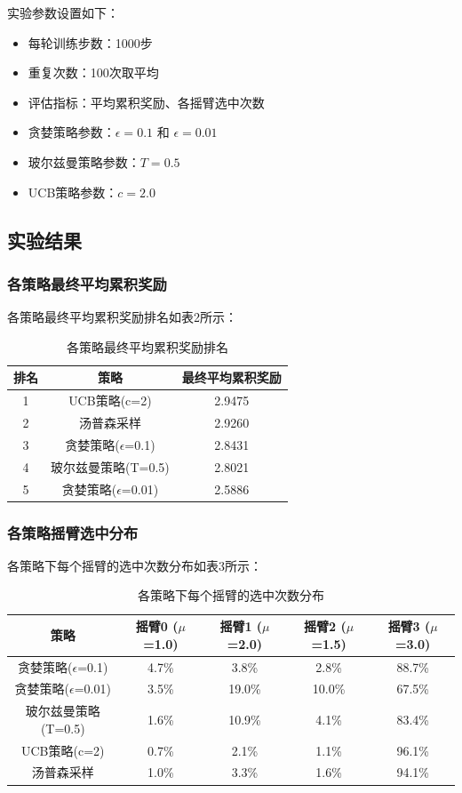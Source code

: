 \documentclass[12pt,a4paper]{article}
\begin{document}
实验参数设置如下：

\begin{itemize}
    \item 每轮训练步数：1000步
    \item 重复次数：100次取平均
    \item 评估指标：平均累积奖励、各摇臂选中次数
    \item 贪婪策略参数：$\epsilon = 0.1$ 和 $\epsilon = 0.01$
    \item 玻尔兹曼策略参数：$T = 0.5$
    \item UCB策略参数：$c = 2.0$
\end{itemize}

\subsection{实验结果}

\subsubsection{各策略最终平均累积奖励}

各策略最终平均累积奖励排名如表2所示：

\begin{table}[H]
\centering
\caption{各策略最终平均累积奖励排名}
\begin{tabular}{ccc}
\toprule
排名 & 策略 & 最终平均累积奖励 \\
\midrule
1 & UCB策略(c=2) & 2.9475 \\
2 & 汤普森采样 & 2.9260 \\
3 & 贪婪策略($\epsilon$=0.1) & 2.8431 \\
4 & 玻尔兹曼策略(T=0.5) & 2.8021 \\
5 & 贪婪策略($\epsilon$=0.01) & 2.5886 \\
\bottomrule
\end{tabular}
\end{table}

\subsubsection{各策略摇臂选中分布}

各策略下每个摇臂的选中次数分布如表3所示：

\begin{table}[H]
\centering
\caption{各策略下每个摇臂的选中次数分布}
\begin{tabular}{ccccc}
\toprule
策略 & 摇臂0 ($\mu$=1.0) & 摇臂1 ($\mu$=2.0) & 摇臂2 ($\mu$=1.5) & 摇臂3 ($\mu$=3.0) \\
\midrule
贪婪策略($\epsilon$=0.1) & 4.7\% & 3.8\% & 2.8\% & 88.7\% \\
贪婪策略($\epsilon$=0.01) & 3.5\% & 19.0\% & 10.0\% & 67.5\% \\
玻尔兹曼策略(T=0.5) & 1.6\% & 10.9\% & 4.1\% & 83.4\% \\
UCB策略(c=2) & 0.7\% & 2.1\% & 1.1\% & 96.1\% \\
汤普森采样 & 1.0\% & 3.3\% & 1.6\% & 94.1\% \\
\bottomrule
\end{tabular}
\end{table}
\end{document}
